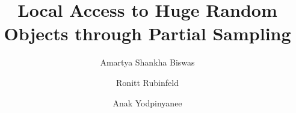 \documentclass[a4paper,UKenglish,cleveref,autoref]{lipics-v2019}
\title{Local Access to Huge Random Objects through Partial Sampling}
\date{}
\author{Amartya Shankha Biswas}{CSAIL, MIT}{asbiswas@mit.edu}{https://orcid.org/0000-0002-5068-1524}{MIT Presidential Fellowship}
\author{Ronitt Rubinfeld}{CSAIL, MIT}{ronitt@csail.mit.edu}{}{NSF grants CCF-1650733, CCF-1733808, IIS-1741137 and CCF-1740751}
\author{Anak Yodpinyanee}{CSAIL, MIT}{anak@csail.mit.edu}{https://orcid.org/0000-0002-7572-2003}
{NSF grants CCF-1650733, CCF-1733808, IIS-1741137 and DPST scholarship, Royal Thai Government}
\theoremstyle{plain}
\begin{document}
\maketitle


\begingroup
  \tableofcontents
\endgroup
\newpage







%

%







\end{document}
